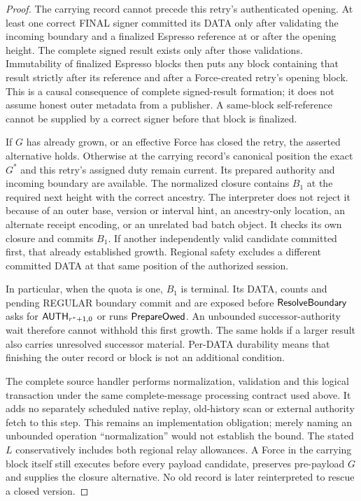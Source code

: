 \begin{proof}
The carrying record cannot precede this retry's authenticated opening.
At least one correct FINAL signer committed its DATA only after
validating the incoming boundary and a finalized Espresso reference
at or after the opening height. The complete signed result exists only
after those validations. Immutability of finalized Espresso blocks
then puts any block containing that result strictly after its reference
and after a Force-created retry's opening block. This is a causal
consequence of complete signed-result formation; it does not assume
honest outer metadata from a publisher. A same-block self-reference
cannot be supplied by a correct signer before that block is finalized.

If $G$ has already grown, or an effective Force has closed the retry,
the asserted alternative holds. Otherwise at the carrying record's
canonical position the exact $G^*$ and this retry's assigned duty remain
current. Its prepared authority and incoming boundary are available.
The normalized closure contains $B_1$ at the required next height with
the correct ancestry. The interpreter does not reject it because of
an outer base, version or interval hint, an ancestry-only location,
an alternate receipt encoding, or an unrelated bad batch object.
It checks its own closure and commits $B_1$. If another independently
valid candidate committed first, that already established growth.
Regional safety excludes a different committed DATA at that same
position of the authorized session.

In particular, when the quota is one, $B_1$ is terminal. Its DATA,
counts and pending REGULAR boundary commit and are exposed before
$\mathsf{ResolveBoundary}$ asks for $\mathsf{AUTH}_{r^*+1,0}$ or runs
$\mathsf{PrepareOwed}$. An unbounded successor-authority wait therefore
cannot withhold this first growth. The same holds if a larger result
also carries unresolved successor material. Per-DATA durability means
that finishing the outer record or block is not an additional condition.

The complete source handler performs normalization, validation and
this logical transaction under the same complete-message processing
contract used above. It adds no separately scheduled native replay,
old-history scan or external authority fetch to this step. This remains
an implementation obligation; merely naming an unbounded operation
``normalization'' would not establish the bound. The stated $L$
conservatively includes both regional relay allowances. A Force in the
carrying block itself still executes before every payload candidate,
preserves pre-payload $G$ and supplies the closure alternative. No old
record is later reinterpreted to rescue a closed version.
\end{proof}


